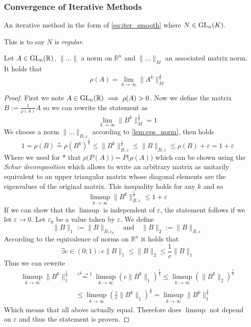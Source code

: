 \subsubsection{Convergence of Iterative Methods}
\begin{definition}
   An iterative method in the form of \cref{eq:iter_smooth} where \(N \in \operatorname{GL}_n(K)\).
\end{definition}
\begin{remark}
   This is to say \(N\) is \emph{regular}.
\end{remark}

\begin{lemma}\label{lem:spec_rad_norm}
   Let \(A \in \operatorname{GL}_n(\mathbb{R})\), \(\|\ldots\|\) a norm on \(\mathbb{R}^n\) and \(\|\ldots\|_M\) an associated matrix norm.
   It holds that
   \[\rho(A) = \lim_{k \to \infty} \|A^k\|_M^\frac{1}{k}\]
\end{lemma}
\begin{proof}
   First we note \(A \in \operatorname{GL}_n(\mathbb{R}) \implies \rho(A) > 0\).
   Now we define the matrix \(B := \frac{1}{\rho(A)} A\) so we can rewrite the statement as
   \[\lim_{k \to \infty} \|B^k\|_M^\frac{1}{k} = 1\]
   We choose a norm \(\|\ldots\|_{B, \varepsilon}\) according to \cref{lem:eps_norm}, then holds
   \[1 = \rho(B) \overset{\ast}{=} \rho(B^k)^\frac{1}{k} \leq \|B^k\|_{B, \varepsilon}^\frac{1}{k} \leq \|B\|_{B, \varepsilon} \leq \rho(B) + \varepsilon = 1 + \varepsilon\]
   Where we used for \(\ast\) that \(\rho\big(P(A)\big) = P\big(\rho(A)\big)\) which can be shown using the \emph{Schur decomposition} which allows to write an arbitrary matrix as unitarily equivalent to an upper triangular matrix whose diagonal elements are the eigenvalues of the original matrix.
   This inequality holds for any \(k\) and so
   \[\limsup_{k \to \infty} \|B^k\|_{B, \varepsilon}^\frac{1}{k} \leq 1 + \varepsilon\]
   If we can show that the \(\limsup\) is independent of \(\varepsilon\), the statement follows if we let \(\varepsilon \to 0\).
   Let \(\varepsilon_0\) be a value taken by \(\varepsilon\).
   We define
   \[\|B\|_1 := \|B\|_{B, \varepsilon_0} \quad\text{and}\quad \|B\|_2 := \|B\|_{B, \varepsilon}\]
   According to the equivalence of norms on \(\mathbb{R}^n\) it holds that
   \[\exists c \in (0; 1): c\|B\|_1 \leq \|B\|_2 \leq \frac{1}{c} \|B\|_1\]
   Thus we can rewrite
   \begin{equation*}
      \begin{split}
         \limsup_{k \to \infty} \|B^k\|_1^\frac{1}{k} & \overset{c^\frac{1}{k} \to 1}{=} \limsup_{k \to \infty} \left(c \|B^k\|_1\right)^\frac{1}{k} \leq \limsup_{k \to \infty}\left(\|B^k\|_2\right)^\frac{1}{k} \\
                                                              & \leq \limsup_{k \to \infty}\left(\frac{1}{c} \|B^k\|_1\right)^\frac{1}{k} = \limsup_{k \to \infty} \|B^k\|_1^\frac{1}{k}
      \end{split}
   \end{equation*}
   Which means that all above actually equal.
   Therefore does \(\limsup\) not depend on \(\varepsilon\) and thus the statement is proven.
\end{proof}

